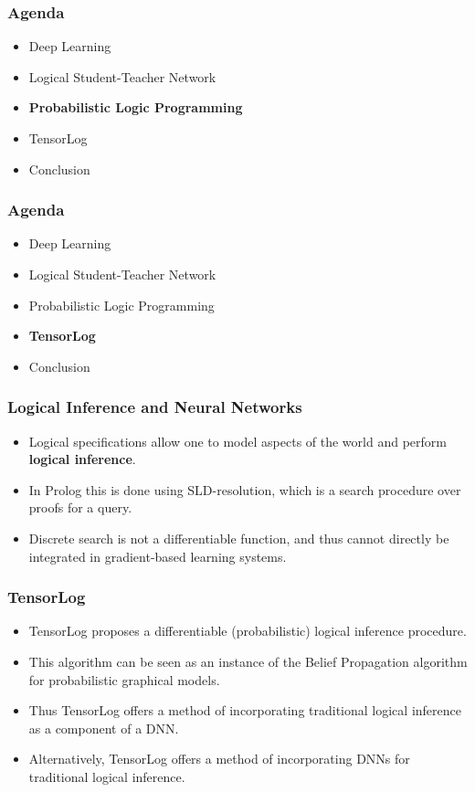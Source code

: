 \documentclass{beamer}
\begin{document}
\begin{frame}
\frametitle{Agenda}
\begin{itemize}
	\item Deep Learning
	\item Logical Student-Teacher Network
	\item \textbf{Probabilistic Logic Programming}
	\item TensorLog
	\item Conclusion
\end{itemize}
\end{frame}


\begin{frame}
\frametitle{Agenda}
\begin{itemize}
	\item Deep Learning
	\item Logical Student-Teacher Network
	\item Probabilistic Logic Programming
	\item \textbf{TensorLog}
	\item Conclusion
\end{itemize}
\end{frame}

\begin{frame}
\frametitle{Logical Inference and Neural Networks}
\begin{itemize}
	\item Logical specifications allow one to model aspects of the world and perform \textbf{logical inference}.
	\item In Prolog this is done using SLD-resolution, which is a search procedure over proofs for a query.
	\item Discrete search is not a differentiable function, and thus cannot directly be integrated in gradient-based learning systems.
\end{itemize}
\end{frame}

\begin{frame}
\frametitle{TensorLog}
\begin{itemize}
	\item TensorLog proposes a differentiable (probabilistic) logical inference procedure.
	\item This algorithm can be seen as an instance of the Belief Propagation algorithm for probabilistic graphical models.
	\item Thus TensorLog offers a method of incorporating traditional logical inference as a component of a DNN.
	\item Alternatively, TensorLog offers a method of incorporating DNNs for traditional logical inference.
\end{itemize}
\end{frame}
\end{document}
